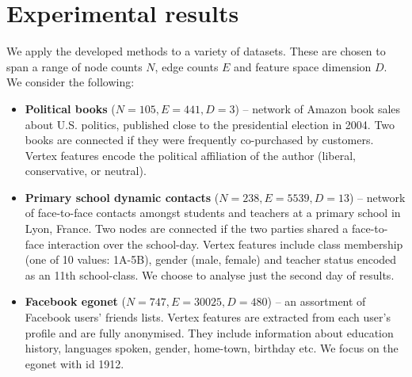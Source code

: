 \section{Experimental results}
\label{sec:experiments}

We apply the developed methods to a variety of datasets. These are chosen to span a range of node counts $N$, edge counts $E$ and feature space dimension $D$. We consider the following:

\begin{itemize}
	\item \textbf{Political books} \cite{polbooks} ($N=105, E=441, D=3$) -- network of Amazon book sales about U.S. politics, published close to the presidential election in 2004. Two books are connected if they were frequently co-purchased by customers. Vertex features encode the political affiliation of the author (liberal, conservative, or neutral).
		
	\item \textbf{Primary school dynamic contacts} \cite{schools} ($N=238, E=5539, D=13$) -- network of face-to-face contacts amongst students and teachers at a primary school in Lyon, France. Two nodes are connected if the two parties shared a face-to-face interaction over the school-day. Vertex features include class membership (one of 10 values: 1A-5B), gender (male, female) and teacher status encoded as an 11th school-class. We choose to analyse just the second day of results.
	
	\item \textbf{Facebook egonet} \cite{fb-snap} ($N=747, E=30025, D=480$) -- an assortment of Facebook users' friends lists. Vertex features are extracted from each user's profile and are fully anonymised. They include information about education history, languages spoken, gender, home-town, birthday etc. We focus on the egonet with id 1912.

\end{itemize}

